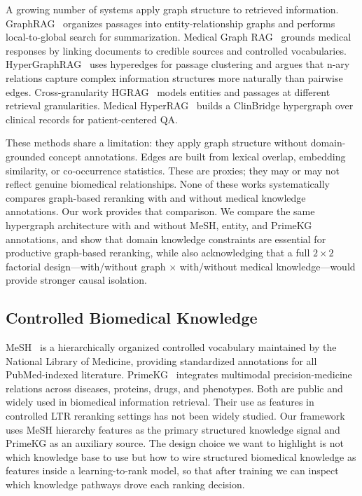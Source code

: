 A growing number of systems apply graph structure to retrieved information. GraphRAG~\citep{edge2024graphrag} organizes passages into entity-relationship graphs and performs local-to-global search for summarization. Medical Graph RAG~\citep{wu2024medgraphrag} grounds medical responses by linking documents to credible sources and controlled vocabularies. HyperGraphRAG~\citep{luo2025hypergraphrag} uses hyperedges for passage clustering and argues that n-ary relations capture complex information structures more naturally than pairwise edges. Cross-granularity HGRAG~\citep{wang2026hgrag} models entities and passages at different retrieval granularities. Medical HyperRAG~\citep{xu2026medicalhyperrag} builds a ClinBridge hypergraph over clinical records for patient-centered QA.

These methods share a limitation: they apply graph structure without domain-grounded concept annotations. Edges are built from lexical overlap, embedding similarity, or co-occurrence statistics. These are proxies; they may or may not reflect genuine biomedical relationships. None of these works systematically compares graph-based reranking with and without medical knowledge annotations. Our work provides that comparison. We compare the same hypergraph architecture with and without MeSH, entity, and PrimeKG annotations, and show that domain knowledge constraints are essential for productive graph-based reranking, while also acknowledging that a full $2{\times}2$ factorial design---with/without graph $\times$ with/without medical knowledge---would provide stronger causal isolation.

\subsection{Controlled Biomedical Knowledge}

MeSH~\citep{nlm2026mesh} is a hierarchically organized controlled vocabulary maintained by the National Library of Medicine, providing standardized annotations for all PubMed-indexed literature. PrimeKG~\citep{chandak2023primekg} integrates multimodal precision-medicine relations across diseases, proteins, drugs, and phenotypes. Both are public and widely used in biomedical information retrieval. Their use as features in controlled LTR reranking settings has not been widely studied. Our framework uses MeSH hierarchy features as the primary structured knowledge signal and PrimeKG as an auxiliary source. The design choice we want to highlight is not which knowledge base to use but how to wire structured biomedical knowledge as features inside a learning-to-rank model, so that after training we can inspect which knowledge pathways drove each ranking decision.
